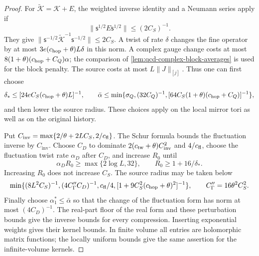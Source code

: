 \documentclass[11pt,letterpaper,reqno]{amsart}
\theoremstyle{definition}
\theoremstyle{remark}
\begin{document}
\begin{proof}
For $\widetilde{\mathcal K}=\mathcal K+E$, the weighted inverse
identity and a Neumann series apply if
\[
 \|\mathsf s^{1/2}E\mathsf s^{1/2}\|\le(2C_S)^{-1}.
\]
They give $\|\mathsf s^{-1/2}\widetilde{\mathcal K}^{-1}
\mathsf s^{-1/2}\|\le2C_S$.  A twist of rate $\delta$ changes
the fine operator by at most
$3e(c_{\rm hop}+\theta)L\delta$ in this norm.  A complex gauge
change costs at most
$8(1+\theta)(c_{\rm hop}+C_Q)\alpha$; the comparison of
\cref{lem:qcd-complex-block-averages} is used for the block penalty.  The source costs
at most $L\|J\|_{[j]}$.  Thus one can first choose
\[
 \delta_*\le[24eC_S(c_{\rm hop}+\theta)L]^{-1},\qquad
 \bar\alpha\le\min\{\sigma_Q,(32C_Q)^{-1},
       [64C_S(1+\theta)(c_{\rm hop}+C_Q)]^{-1}\},
\]
and then lower the source radius.  These choices apply on the local
mirror tori as well as on the original history.

Put $C_{\mathrm{inv}}=\max\{2/\theta+2LC_S,2/c_{\rm fl}\}$.
The Schur formula bounds the fluctuation inverse by $C_{\mathrm{inv}}$.
Choose $C_D$ to dominate $2(c_{\rm tw}+\theta)C_{\mathrm{inv}}^2$
and $4/c_{\rm fl}$, choose the fluctuation twist rate $\alpha_D$
after $C_D$, and increase $R_0$ until
\[
 \alpha_DR_0\ge\max\{2\log L,32\},\qquad
 R_0\ge1+16/\delta_*.
\]
Increasing $R_0$ does not increase $C_S$.  The source radius may be
taken below
\[
 \min\{(8L^2C_S)^{-1},(4C''_\Gamma C_D)^{-1},
 c_{\rm fl}/4,[1+9C_S^2(c_{\rm hop}+\theta)^2]^{-1}\},
 \qquad C''_\Gamma=16\theta^2C_S^2.
\]
Finally choose $\alpha_1^*\le\bar\alpha$ so that the change of
the fluctuation form has norm at most $(4C_D)^{-1}$.
The real-part floor of the real form and these perturbation bounds
give the inverse bounds for every compression.  Inserting exponential
weights gives their kernel bounds.  In finite volume all entries
are holomorphic matrix functions; the locally uniform bounds give
the same assertion for the infinite-volume kernels.
\end{proof}
\end{document}
